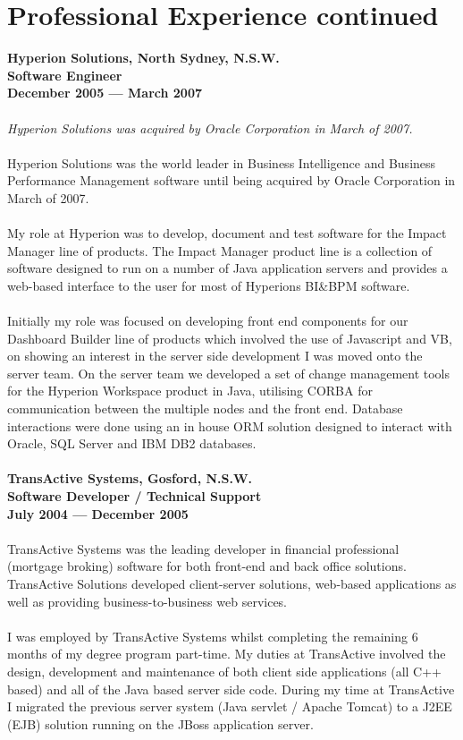 \documentclass[a4paper]{article}
\begin{document}
\section*{Professional Experience continued}
\textbf{Hyperion Solutions, North Sydney, N.S.W.\\Software Engineer\\December 2005 --- March 2007} \\\\
\emph{Hyperion Solutions was acquired by Oracle Corporation in March of 2007.}\\\\
Hyperion Solutions was the world leader in Business Intelligence and Business Performance Management software until being acquired by Oracle Corporation in March of 2007.\\\\
My role at Hyperion was to develop, document and test software for the Impact Manager line of products. The Impact Manager product line is a collection of software designed to run on a number of Java application servers and provides a web-based interface to the user for most of Hyperions BI\&BPM software.\\\\
Initially my role was focused on developing front end components for our Dashboard Builder line of products which involved the use of Javascript and VB, on showing an interest in the server side development I was moved onto the server team. On the server team we developed a set of change management tools for the Hyperion Workspace product in Java, utilising CORBA for communication between the multiple nodes and the front end. Database interactions were done using an in house ORM solution designed to interact with Oracle, SQL Server and IBM DB2 databases.\\\\
\textbf{TransActive Systems, Gosford, N.S.W.\\Software Developer / Technical Support\\July 2004 --- December 2005}\\\\
TransActive Systems was the leading developer in financial professional (mortgage broking) software for both front-end and back office solutions. TransActive Solutions developed client-server solutions, web-based applications as well as providing business-to-business web services.\\\\
I was employed by TransActive Systems whilst completing the remaining 6 months of my degree program part-time. My duties at TransActive involved the design, development and maintenance of both client side applications (all C++ based) and all of the Java based server side code. During my time at TransActive I migrated the previous server system (Java servlet / Apache Tomcat) to a J2EE (EJB) solution running on the JBoss application server.\\\\
\end{document}
